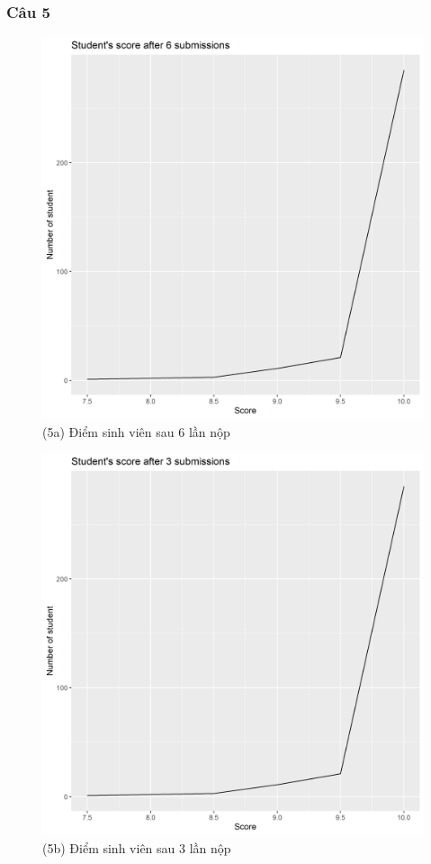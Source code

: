 \documentclass[a4paper]{article}
\theoremstyle{definition}
\begin{document}
\subsubsection{Câu 5}
\begin{figure}[!ht]
    \centering
    \includegraphics[scale=0.4]{Pics/q5a_file1.png}
    \caption{(5a) Điểm sinh viên sau 6 lần nộp}
    \label{fig:my_label}
\end{figure}
\begin{figure}[!ht]
    \centering
    \includegraphics[scale=0.4]{Pics/q5b_file1.png}
    \caption{(5b) Điểm sinh viên sau 3 lần nộp}
    \label{fig:my_label}
\end{figure}
\end{document}
